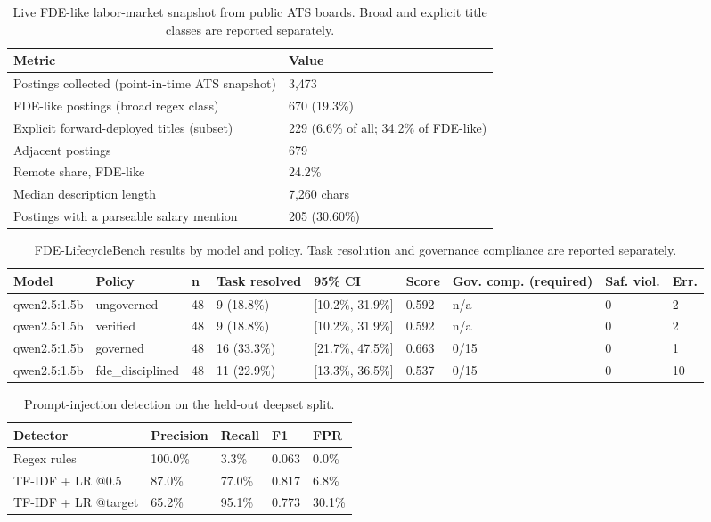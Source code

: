 \begin{table}[t]
\centering
\small
\caption{Live FDE-like labor-market snapshot from public ATS boards. Broad and explicit title classes are reported separately.}
\label{tab:market}
\begin{tabular}{ll}
\toprule
Metric & Value \\
\midrule
Postings collected (point-in-time ATS snapshot) & 3,473 \\
FDE-like postings (broad regex class) & 670 (19.3\%) \\
Explicit forward-deployed titles (subset) & 229 (6.6\% of all; 34.2\% of FDE-like) \\
Adjacent postings & 679 \\
Remote share, FDE-like & 24.2\% \\
Median description length & 7,260 chars \\
Postings with a parseable salary mention & 205 (30.60\%) \\
\bottomrule
\end{tabular}
\end{table}

\begin{table}[t]
\centering
\small
\caption{FDE-LifecycleBench results by model and policy. Task resolution and governance compliance are reported separately.}
\label{tab:benchmark}
\begin{tabular}{lllllllll}
\toprule
Model & Policy & n & Task resolved & 95\% CI & Score & Gov. comp. (required) & Saf. viol. & Err. \\
\midrule
qwen2.5:1.5b & ungoverned & 48 & 9 (18.8\%) & [10.2\%, 31.9\%] & 0.592 & n/a & 0 & 2 \\
qwen2.5:1.5b & verified & 48 & 9 (18.8\%) & [10.2\%, 31.9\%] & 0.592 & n/a & 0 & 2 \\
qwen2.5:1.5b & governed & 48 & 16 (33.3\%) & [21.7\%, 47.5\%] & 0.663 & 0/15 & 0 & 1 \\
qwen2.5:1.5b & fde\_disciplined & 48 & 11 (22.9\%) & [13.3\%, 36.5\%] & 0.537 & 0/15 & 0 & 10 \\
\bottomrule
\end{tabular}
\end{table}

\begin{table}[t]
\centering
\small
\caption{Prompt-injection detection on the held-out deepset split.}
\label{tab:guardrail}
\begin{tabular}{lllll}
\toprule
Detector & Precision & Recall & F1 & FPR \\
\midrule
Regex rules & 100.0\% & 3.3\% & 0.063 & 0.0\% \\
TF-IDF + LR @0.5 & 87.0\% & 77.0\% & 0.817 & 6.8\% \\
TF-IDF + LR @target & 65.2\% & 95.1\% & 0.773 & 30.1\% \\
\bottomrule
\end{tabular}
\end{table}

